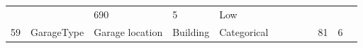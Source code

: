 \documentclass[11pt]{article}
\begin{document}
\begin{longtable}[]{@{}llllllllllll@{}}
\begin{minipage}[t]{0.04\columnwidth}
\strut
\end{minipage} & \begin{minipage}[t]{0.04\columnwidth}\raggedright\strut
\strut
\end{minipage} & \begin{minipage}[t]{0.04\columnwidth}\raggedright\strut
690\strut
\end{minipage} & \begin{minipage}[t]{0.04\columnwidth}\raggedright\strut
5\strut
\end{minipage} & \begin{minipage}[t]{0.04\columnwidth}\raggedright\strut
Low\strut
\end{minipage}\tabularnewline
\begin{minipage}[t]{0.04\columnwidth}\raggedright\strut
59\strut
\end{minipage} & \begin{minipage}[t]{0.04\columnwidth}\raggedright\strut
GarageType\strut
\end{minipage} & \begin{minipage}[t]{0.04\columnwidth}\raggedright\strut
Garage location\strut
\end{minipage} & \begin{minipage}[t]{0.04\columnwidth}\raggedright\strut
Building\strut
\end{minipage} & \begin{minipage}[t]{0.04\columnwidth}\raggedright\strut
Categorical\strut
\end{minipage} & \begin{minipage}[t]{0.04\columnwidth}\raggedright\strut
\strut
\end{minipage} & \begin{minipage}[t]{0.04\columnwidth}\raggedright\strut
\strut
\end{minipage} & \begin{minipage}[t]{0.04\columnwidth}\raggedright\strut
\strut
\end{minipage} & \begin{minipage}[t]{0.04\columnwidth}\raggedright\strut
\strut
\end{minipage} & \begin{minipage}[t]{0.04\columnwidth}\raggedright\strut
81\strut
\end{minipage} & \begin{minipage}[t]{0.04\columnwidth}\raggedright\strut
6\strut
\end{minipage} & \begin{minipage}[t]{0.04\columnwidth}\raggedright\strut

\end{minipage}
\end{longtable}
\end{document}
